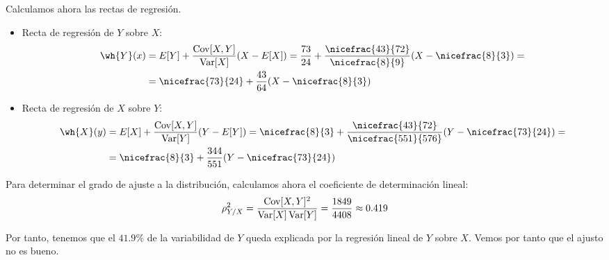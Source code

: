 \begin{ejercicio}
    Calculamos ahora las rectas de regresión.
    \begin{itemize}
        \item Recta de regresión de $Y$ sobre $X$:
        \begin{align*}
            \wh{Y}(x) &= E[Y] + \dfrac{\Cov[X,Y]}{\Var[X]}(X - E[X])
            = \frac{73}{24} + \dfrac{\nicefrac{43}{72}}{\nicefrac{8}{9}}(X - \nicefrac{8}{3})
            =\\&= \nicefrac{73}{24} + \dfrac{43}{64}(X - \nicefrac{8}{3})
        \end{align*}

        \item Recta de regresión de $X$ sobre $Y$:
        \begin{align*}
            \wh{X}(y) &= E[X] + \dfrac{\Cov[X,Y]}{\Var[Y]}(Y - E[Y])
            = \nicefrac{8}{3} + \dfrac{\nicefrac{43}{72}}{\nicefrac{551}{576}}(Y - \nicefrac{73}{24})
            =\\&= \nicefrac{8}{3} + \dfrac{344}{551}(Y - \nicefrac{73}{24})
        \end{align*}
    \end{itemize}

    Para determinar el grado de ajuste a la distribución, calculamos ahora el coeficiente de determinación lineal:
    \begin{equation*}
        \rho_{Y/X}^2 = \dfrac{\operatorname{Cov}[X,Y]^2}{\operatorname{Var}[X]\operatorname{Var}[Y]} = \dfrac{1849}{4408} \approx 0.419
    \end{equation*}

    Por tanto, tenemos que el $41.9\%$ de la variabilidad de $Y$ queda explicada por la regresión lineal de $Y$ sobre $X$.
    Vemos por tanto que el ajusto no es bueno.
\end{ejercicio}

